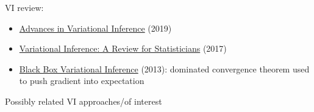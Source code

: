 \documentclass[10pt]{article}
\begin{document}
VI review:
\begin{itemize}
\item
\href{https://s3.amazonaws.com/ieeecs.cdn.csdl.content/trans/tp/2019/08/08588399.pdf?AWSAccessKeyId=ASIA2Z6GPE73ITPNF4HV&Expires=1646432232&Signature=%2BwbeAhSyM%2FMqzaAhLaunhuq30BI%3D&x-amz-security-token=IQoJb3JpZ2luX2VjEP7%2F%2F%2F%2F%2F%2F%2F%2F%2F%2FwEaCXVzLWVhc3QtMSJGMEQCIGoE%2FVHY77X2Kpq0J47Ic29AHEKJ%2F%2FS0foSv98aaP%2F%2BxAiAYu9FImOV6wjyu7v9HkfGlfyytEvSd2wujoh7wIivaTyqdAghmEAAaDDc0MjkwODcwMDY2MiIMYEqAQr9DL2OWCGlbKvoB58nRjaBdUqwysmhAcnlM2JP60usEfHlgP0Bn2xGYd1kZJPiEKzmA%2F76Bo7YRZ2z%2FpCEaHPV7aFI6ikqSiJToz5QlGqPUQp5GF6qR5TSKEJ5oMTODfVyUt5xdcYOww012wn%2FyqAE3T9hRTF%2FyxhZeY6Q1xrj3Bzu8p0jP7NO30Xoje2Oct8JA6sOwhgFEL5rjtIpPoiiAywnSeWz8Ia8ra4tpCOPbG8T3SLq%2BFE4SS3BrviPuGWH0b0vr2EzBSZEoWFySA87d27hh99%2B%2BsLKLvcu4u3VGRUWb%2FpwIYAT88MBxL1RhCazyRj4eByB%2FsbVAhmGQ0bYAYYZT1TDqhYqRBjqbAcZHTiSLr48H4Ha2O6bVtVfH9%2B8e%2FmWAg2joY8DUAAvhdiGeqGLdPfgpNE0%2BpXfJI%2BKR8LeVrJvtfpYI3LV2RQn%2B3y2cnzIrosiNxE68tL4U%2BsW4uor4O6eZ8qvF%2Bvr7ncAy4rulMRlaqpgY%2FehIGk5UxsUPTr4zC%2BYNJXlKu28DlNal14YG5ugTN3VC5sgxL%2B%2Bq%2BEp8ibbwRzSf}{Advances in Variational Inference} (2019)
\item
\href{https://www.tandfonline.com/doi/full/10.1080/01621459.2017.1285773}{Variational Inference: A Review for Statisticians} (2017)
\item
\href{https://arxiv.org/pdf/1401.0118.pdf}{Black Box Variational Inference} (2013): dominated convergence theorem used to push gradient into expectation
\end{itemize}
Possibly related VI approaches/of interest
\end{document}
